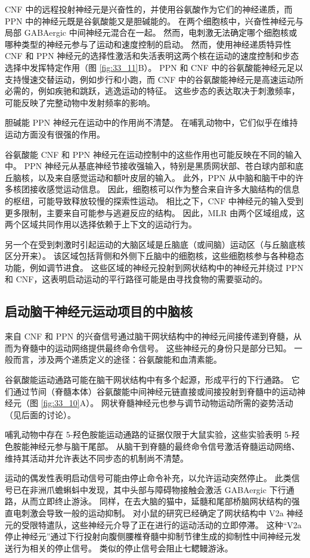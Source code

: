 CNF 中的远程投射神经元是兴奋性的，并使用谷氨酸作为它们的神经递质，而 PPN 中的神经元既是谷氨酸能又是胆碱能的。 在两个细胞核中，兴奋性神经元与局部 GABAergic 中间神经元混合在一起。 然而，电刺激无法确定哪个细胞核或哪种类型的神经元参与了运动和速度控制的启动。 然而，使用神经递质特异性 CNF 和 PPN 神经元的选择性激活和失活表明这两个核在运动的速度控制和步态选择中发挥特定作用（图 \ref{fig:33_11}B）。 PPN 和 CNF 中的谷氨酸能神经元足以支持慢速交替运动，例如步行和小跑，而 CNF 中的谷氨酸能神经元是高速运动所必需的，例如疾驰和跳跃，逃逸运动的特征。 这些步态的表达取决于刺激频率，可能反映了完整动物中发射频率的影响。

胆碱能 PPN 神经元在运动中的作用尚不清楚。 在哺乳动物中，它们似乎在维持运动方面没有很强的作用。

谷氨酸能 CNF 和 PPN 神经元在运动控制中的这些作用也可能反映在不同的输入中。 PPN 神经元从基底神经节接收强输入，特别是黑质网状部、苍白球内部和底丘脑核，以及来自感觉运动和额叶皮层的输入。 此外，PPN 从中脑和脑干中的许多核团接收感觉运动信息。 因此，细胞核可以作为整合来自许多大脑结构的信息的枢纽，可能导致释放较慢的探索性运动。 相比之下，CNF 中神经元的输入受到更多限制，主要来自可能参与逃避反应的结构。 因此，MLR 由两个区域组成，这两个区域共同作用以选择依赖于上下文的运动行为。

另一个在受到刺激时引起运动的大脑区域是丘脑底（或间脑）运动区（与丘脑底核区分开来）。 该区域包括背侧和外侧下丘脑中的细胞核，这些细胞核参与各种稳态功能，例如调节进食。 这些区域的神经元投射到网状结构中的神经元并绕过 PPN 和 CNF，这表明启动运动的平行路径可能是由寻找食物的需要驱动的。

\subsection{启动脑干神经元运动项目的中脑核}
来自 CNF 和 PPN 的兴奋信号通过脑干网状结构中的神经元间接传递到脊髓，从而为脊髓中的运动网络提供最终命令信号。 这些神经元的身份只是部分已知。 一般而言，涉及两个递质定义的途径：谷氨酸能和血清素能。

谷氨酸能运动通路可能在脑干网状结构中有多个起源，形成平行的下行通路。 它们通过节间（脊髓本体）谷氨酸能中间神经元链直接或间接投射到脊髓中的运动神经元（图 \ref{fig:33_10}A）。 网状脊髓神经元也参与调节动物运动所需的姿势活动（见后面的讨论）。

哺乳动物中存在 5-羟色胺能运动通路的证据仅限于大鼠实验，这些实验表明 5-羟色胺能神经元参与脑干尾部。 从脑干到脊髓的最终命令信号激活脊髓运动网络、维持其活动并允许表达不同步态的机制尚不清楚。

运动的偶发性表明启动信号可能由停止命令补充，以允许运动突然停止。 此类信号已在非洲爪蟾蝌蚪中发现，其中头部与障碍物接触会激活 GABAergic 下行通路，从而立即终止游泳。 同样，在去大脑的猫中，延髓和尾部桥脑网状结构的强直电刺激会导致一般的运动抑制。 对小鼠的研究已经确定了网状结构中 V2a 神经元的受限特遣队，这些神经元介导了正在进行的运动活动的立即停滞。 这种“V2a 停止神经元”通过下行投射向腹侧腰椎脊髓中抑制节律生成的抑制性中间神经元发送行为相关的停止信号。 类似的停止信号会阻止七鳃鳗游泳。

